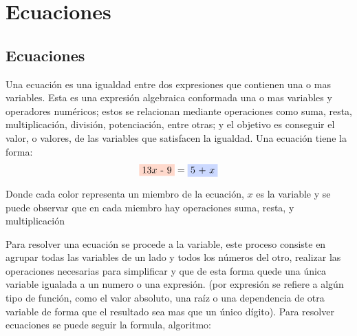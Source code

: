 
\section{Ecuaciones}
\subsection{Ecuaciones}
Una ecuación es una igualdad entre dos expresiones que contienen una o mas
variables.  Esta es una expresión algebraica conformada una o mas variables y
operadores numéricos; estos se relacionan mediante operaciones como
suma, resta, multiplicación, división, potenciación, entre otras; y el objetivo
es conseguir el valor, o valores, de las variables que satisfacen la igualdad.
Una ecuación tiene la forma:
$$ \colorbox{RojoClaro}{13$x$ - 9}= \colorbox{AzulClaro}{5 + $x$} $$

Donde cada color representa un miembro de la ecuación, $x$ es la variable y se
puede observar que en cada miembro hay operaciones  suma, resta, y multiplicación


Para resolver una ecuación se procede a  la variable, este
proceso consiste
en agrupar todas las variables de un lado y todos los números del otro, realizar
las operaciones necesarias para simplificar y que de esta forma quede una única
variable igualada a un numero o una expresión. (por expresión se refiere a algún
tipo de función, como el valor absoluto, una raíz o una dependencia de otra variable
de forma que el resultado sea mas que un único dígito). Para resolver ecuaciones
se puede seguir la formula, algoritmo:


